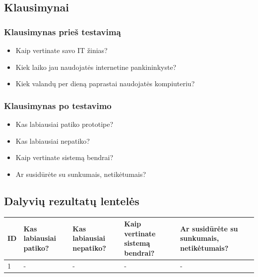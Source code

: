 \documentclass[oneside]{VUMIFPSkursinis}
\begin{document}
\subsection{Klausimynai}
\subsubsection{Klausimynas prieš testavimą}
\begin{itemize}
	\item Kaip vertinate savo IT žinias?
	\item Kiek laiko jau naudojatės internetine pankininkyste?
	\item Kiek valandų per dieną paprastai naudojatės kompiuteriu?
\end{itemize}
\subsubsection{Klausimynas po testavimo}
	\begin{itemize}
			\item Kas labiausiai patiko prototipe?
			\item Kas labiausiai nepatiko?
			\item Kaip vertinate sistemą bendrai?
			\item Ar susidūrėte su sunkumais, netikėtumais?
	\end{itemize}
\subsection{Dalyvių rezultatų lentelės}
\begin{center}
	\begin{tabular}{ |p{1cm} | p{3cm} | p{4cm} | p{4cm} | p{3cm} |}
	\hline
ID&Kas labiausiai patiko?&Kas labiausiai nepatiko?&Kaip vertinate sistemą bendrai?&Ar susidūrėte su sunkumais, netikėtumais?\\ \hline
1&-&-&-&- \\ \hline

	\end{tabular}
\end{center}
\end{document}

